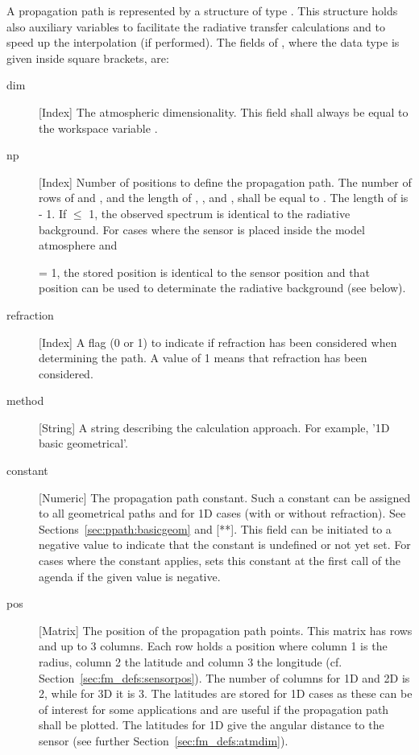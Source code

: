 A propagation path is represented by a structure of type
. This structure holds also auxiliary variables to
facilitate the radiative transfer calculations and to speed up the
interpolation (if performed). The fields of , where
the data type is given inside square brackets, are:
\begin{description}

  \item[dim] [Index] The atmospheric dimensionality. This field shall always 
     be equal to the workspace variable .
     
   \item[np] [Index] Number of positions to define the propagation
     path. The number of rows of  and ,
     and the length of , ,
      and , shall be equal to
     . The length of  is
      - 1. If  $\leq$ 1, the observed
     spectrum is identical to the radiative background. For cases
     where the sensor is placed inside the model atmosphere and

      = 1, the stored position is identical to the sensor
     position and that position can be used to determinate the radiative
     background (see below).

   \item[refraction] [Index] A flag (0 or 1) to indicate if refraction
     has been considered when determining the path. A value of 1 means
     that refraction has been considered.

   \item[method] [String] A string describing the calculation approach.
     For example, '1D basic geometrical'.
     
   \item[constant] [Numeric] The propagation path constant. Such a
     constant can be assigned to all geometrical paths and for 1D
     cases (with or without refraction). See
     Sections~\ref{sec:ppath:basicgeom} and [**]. This field can be
     initiated to a negative value to indicate that the constant is
     undefined or not yet set. For cases where the constant applies,
      sets this constant at the first
     call of the agenda if the given value is negative.

   \item[pos] [Matrix] The position of the propagation path points.
     This matrix has  rows and up to 3 columns. Each row
     holds a position where column 1 is the radius, column 2 the
     latitude and column 3 the longitude (cf.
     Section~\ref{sec:fm_defs:sensorpos}). The number of columns for
     1D and 2D is 2, while for 3D it is 3. The latitudes are stored
     for 1D cases as these can be of interest for some applications
     and are useful if the propagation path shall be plotted. The
     latitudes for 1D give the angular distance to the sensor (see
     further Section~\ref{sec:fm_defs:atmdim}).
     

\end{description}
